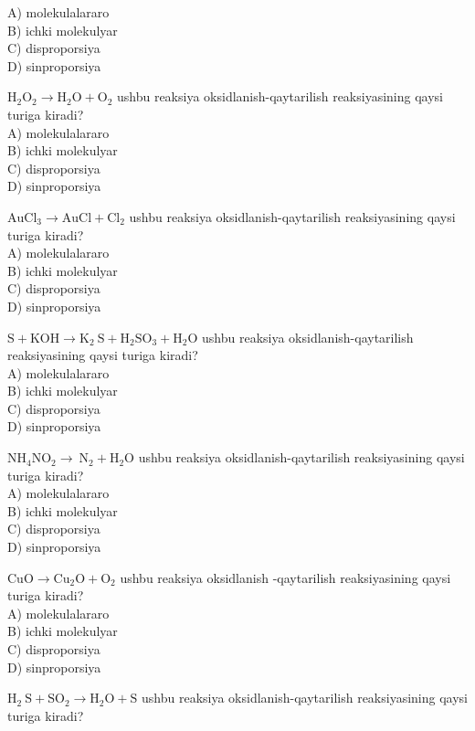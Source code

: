 A) molekulalararo\\
B) ichki molekulyar\\
C) disproporsiya\\
D) sinproporsiya
  \item $\mathrm{H}_{2} \mathrm{O}_{2} \rightarrow \mathrm{H}_{2} \mathrm{O}+\mathrm{O}_{2}$ ushbu reaksiya oksidlanish-qaytarilish reaksiyasining qaysi turiga kiradi?\\
A) molekulalararo\\
B) ichki molekulyar\\
C) disproporsiya\\
D) sinproporsiya
  \item $\mathrm{AuCl}_{3} \rightarrow \mathrm{AuCl}+\mathrm{Cl}_{2}$ ushbu reaksiya oksidlanish-qaytarilish reaksiyasining qaysi turiga kiradi?\\
A) molekulalararo\\
B) ichki molekulyar\\
C) disproporsiya\\
D) sinproporsiya
  \item $\mathrm{S}+\mathrm{KOH} \rightarrow \mathrm{K}_{2} \mathrm{~S}+\mathrm{H}_{2} \mathrm{SO}_{3}+\mathrm{H}_{2} \mathrm{O}$ ushbu reaksiya oksidlanish-qaytarilish reaksiyasining qaysi turiga kiradi?\\
A) molekulalararo\\
B) ichki molekulyar\\
C) disproporsiya\\
D) sinproporsiya
  \item $\mathrm{NH}_{4} \mathrm{NO}_{2} \rightarrow \mathrm{~N}_{2}+\mathrm{H}_{2} \mathrm{O}$ ushbu reaksiya oksidlanish-qaytarilish reaksiyasining qaysi turiga kiradi?\\
A) molekulalararo\\
B) ichki molekulyar\\
C) disproporsiya\\
D) sinproporsiya
  \item $\mathrm{CuO} \rightarrow \mathrm{Cu}_{2} \mathrm{O}+\mathrm{O}_{2}$ ushbu reaksiya oksidlanish -qaytarilish reaksiyasining qaysi turiga kiradi?\\
A) molekulalararo\\
B) ichki molekulyar\\
C) disproporsiya\\
D) sinproporsiya
  \item $\mathrm{H}_{2} \mathrm{~S}+\mathrm{SO}_{2} \rightarrow \mathrm{H}_{2} \mathrm{O}+\mathrm{S}$ ushbu reaksiya oksidlanish-qaytarilish reaksiyasining qaysi turiga kiradi?\\
